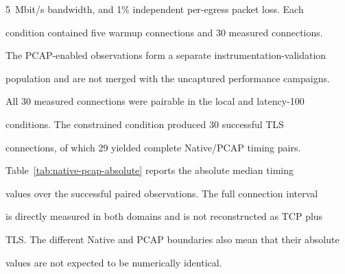 \documentclass[journal]{IEEEtran}
\begin{document}
5~Mbit/s bandwidth, and 1\% independent per-egress packet loss. Each

condition contained five warmup connections and 30 measured connections.

The PCAP-enabled observations form a separate instrumentation-validation

population and are not merged with the uncaptured performance campaigns.

All 30 measured connections were pairable in the local and latency-100

conditions. The constrained condition produced 30 successful TLS

connections, of which 29 yielded complete Native/PCAP timing pairs.



Table~\ref{tab:native-pcap-absolute} reports the absolute median timing

values over the successful paired observations. The full connection interval

is directly measured in both domains and is not reconstructed as TCP plus

TLS. The different Native and PCAP boundaries also mean that their absolute

values are not expected to be numerically identical.
\end{document}
